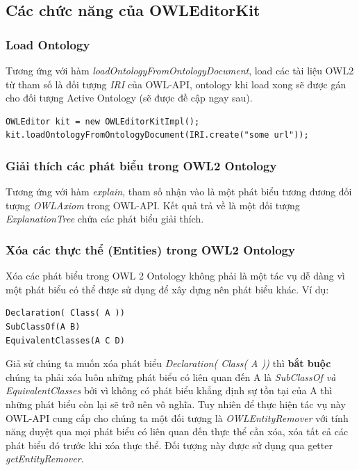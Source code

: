 \subsection{Các chức năng của OWLEditorKit}

\subsubsection{Load Ontology}
Tương ứng với hàm \textit{loadOntologyFromOntologyDocument}, load các tài liệu OWL2 từ tham số là đối tượng \textit{IRI} của OWL-API, ontology khi load xong sẽ được gán cho đối tượng Active Ontology (sẽ được đề cập ngay sau).
\begin{verbatim}
OWLEditor kit = new OWLEditorKitImpl();
kit.loadOntologyFromOntologyDocument(IRI.create("some url"));
\end{verbatim}
\subsubsection{Giải thích các phát biểu trong OWL2 Ontology}
Tương ứng với hàm \textit{explain}, tham số nhận vào là một phát biểu tương đương đối tượng \textit{OWLAxiom} trong OWL-API. Kết quả trả về là một đối tượng \textit{ExplanationTree} chứa các phát biểu giải thích.

\subsubsection{Xóa các thực thể (Entities) trong OWL2 Ontology}
Xóa các phát biểu trong OWL 2 Ontology không phải là một tác vụ dễ dàng vì một phát biểu có thể được sử dụng để xây dựng nên phát biểu khác. Ví dụ:
\begin{verbatim}
Declaration( Class( A ))
SubClassOf(A B)
EquivalentClasses(A C D)
\end{verbatim}
Giả sử chúng ta muốn xóa phát biểu \textit{Declaration( Class( A ))} thì \textbf{bắt buộc} chúng ta phải xóa luôn những phát biểu có liên quan đến A là \textit{SubClassOf và EquivalentClasses}  bởi vì không có phát biểu khẳng định sự tồn tại của A thì những phát biểu còn lại sẽ trở nên vô nghĩa. Tuy nhiên để thực hiện tác vụ này OWL-API cung cấp cho chúng ta một đối tượng là \textit{OWLEntityRemover} với tính năng duyệt qua mọi phát biểu có liên quan đến thực thể cần xóa, xóa tất cả các phát biểu đó trước khi xóa thực thể. Đối tượng này được sử dụng qua getter \textit{getEntityRemover}.

